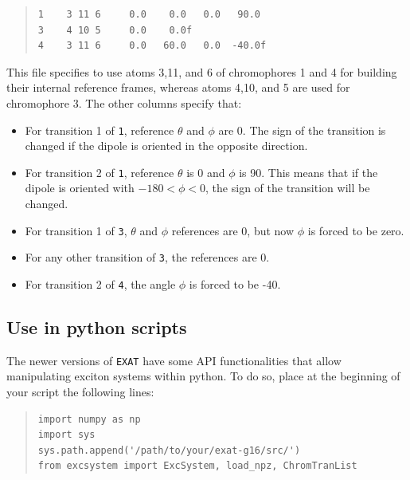 \documentclass[a4paper,11pt]{article}
\begin{document}
\begin{framed}
\begin{quote}
\begin{verbatim}
1    3 11 6     0.0    0.0   0.0   90.0
3    4 10 5     0.0    0.0f 
4    3 11 6     0.0   60.0   0.0  -40.0f
\end{verbatim}
\end{quote}
\end{framed}

This file specifies to use atoms 3,11, and 6 of chromophores 1 and 4 for building their internal reference frames, whereas atoms 4,10, and 5 are used for chromophore 3. 
The other columns specify that:
\begin{itemize}
\item For transition 1 of \texttt{1}, reference $\theta$ and $\phi$ are 0. The sign of the transition is changed if the dipole is oriented in the opposite direction.
\item For transition 2 of \texttt{1}, reference $\theta$ is 0 and $\phi$ is 90. This means that if the dipole is oriented with $-180 < \phi < 0$, the sign of the transition will be changed.
\item For transition 1 of \texttt{3}, $\theta$ and $\phi$ references are 0, but now $\phi$ is forced to be zero.
\item For any other transition of \texttt{3}, the references are 0.
\item For transition 2 of \texttt{4}, the angle $\phi$ is forced to be -40.
\end{itemize}

\subsection{Use in python scripts}

The newer versions of \texttt{EXAT} have some API functionalities that allow manipulating exciton systems within python. To do so, place at the beginning of your script the following lines:
\begin{framed}
\begin{quote}
\begin{verbatim}
import numpy as np
import sys
sys.path.append('/path/to/your/exat-g16/src/')
from excsystem import ExcSystem, load_npz, ChromTranList
\end{verbatim}
\end{quote}
\end{framed}
\end{document}
